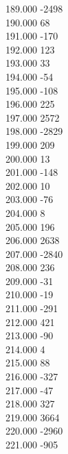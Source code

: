 { 189.000	-2498 \\
 190.000	68 \\
 191.000	-170 \\
 192.000	123 \\
 193.000	33 \\
 194.000	-54 \\
 195.000	-108 \\
 196.000	225 \\
 197.000	2572 \\
 198.000	-2829 \\
 199.000	209 \\
 200.000	13 \\
 201.000	-148 \\
 202.000	10 \\
 203.000	-76 \\
 204.000	8 \\
 205.000	196 \\
 206.000	2638 \\
 207.000	-2840 \\
 208.000	236 \\
 209.000	-31 \\
 210.000	-19 \\
 211.000	-291 \\
 212.000	421 \\
 213.000	-90 \\
 214.000	4 \\
 215.000	88 \\
 216.000	-327 \\
 217.000	-47 \\
 218.000	327 \\
 219.000	3664 \\
 220.000	-2960 \\
 221.000	-905 \\
}
